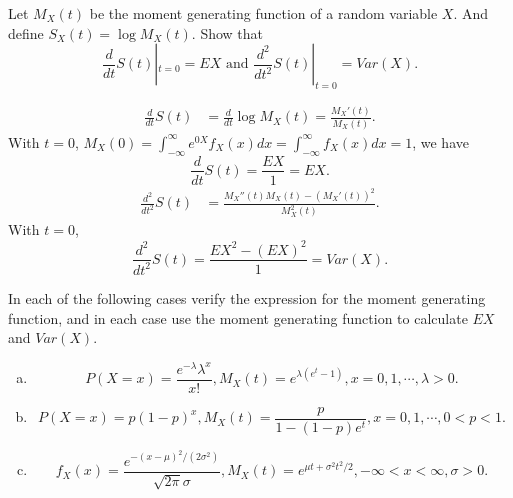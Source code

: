 \documentclass[14pt]{elegantbook}
\begin{document}
    \setcounter{exer}{31}
    \begin{exercise}
        Let $M_X(t)$ be the moment generating function of a random variable $X$. And define $S_X(t)=\log M_X(t)$. Show that
        $$\frac{d}{dt}S(t)|_{t=0}=EX\text{  and  }\frac{d^2}{dt^2}S(t)|_{t=0}=Var(X). $$
    \end{exercise}

    \begin{solution}
        \begin{align*}
            \frac{d}{dt}S(t)&=\frac{d}{dt}\log M_X(t)=\frac{M_X'(t)}{M_X(t)}. 
        \end{align*}
        With $t=0$, $M_X(0)=\int_{-\infty}^\infty e^{0X}f_X(x)dx=\int_{-\infty}^\infty f_X(x)dx=1$, we have
        \[\frac{d}{dt}S(t)=\frac{EX}{1}=EX. \]
        \begin{align*}
            \frac{d^2}{dt^2}S(t)&=\frac{M_X''(t)M_X(t)-(M_X'(t))^2}{M_X^2(t)}. 
        \end{align*}
        With $t=0$, 
        \[\frac{d^2}{dt^2}S(t)=\frac{EX^2-(EX)^2}{1}=Var(X). \]
    \end{solution}

    \begin{exercise}
        In each of the following cases verify the expression for the moment generating function, and in each case use the moment generating function to calculate $EX$ and $Var(X)$. 
        \begin{enumerate}[(a)]
            \item \[P(X=x)=\frac{e^{-\lambda}\lambda^x}{x!}, M_X(t)=e^{\lambda (e^t-1)}, x=0,1,\cdots, \lambda>0. \]
            \item \[P(X=x)=p(1-p)^x, M_X(t)=\frac{p}{1-(1-p)e^t}, x=0,1,\cdots, 0<p<1. \]
            \item \[f_X(x)=\frac{e^{-(x-\mu)^2/(2\sigma^2)}}{\sqrt{2\pi}\sigma}, M_X(t)=e^{\mu t+\sigma^2t^2/2}, -\infty<x<\infty, \sigma>0. \]
        \end{enumerate}
    \end{exercise}
\end{document}
